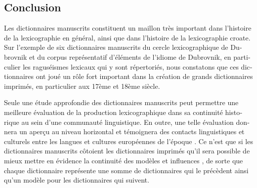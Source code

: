 \documentclass[output=paper,colorlinks,citecolor=brown,arabicfont,chinesefont,booklanguage=french]{langscibook}
\begin{document}
\begin{otherlanguage}{french}
\section{Conclusion}

Les dictionnaires manuscrits constituent un maillon très important dans l’histoire de la lexicographie en général, ainsi que dans l’histoire de la lexicographie croate. Sur l’exemple de six dictionnaires manuscrits du cercle lexicographique de Dubrovnik et du corpus représentatif d’éléments de l’idiome de Dubrovnik, en particulier les raguséismes lexicaux qui y sont répertoriés, nous constatons que ces dictionnaires ont joué un rôle fort important dans la création de grands dictionnaires imprimés, en particulier aux 17ème et 18ème siècle. 

Seule une étude approfondie des dictionnaires manuscrits peut permettre une meilleure évaluation de la production lexicographique dans sa continuité historique au sein d’une communauté linguistique. En outre, une telle évaluation donnera un aperçu au niveau horizontal et témoignera des contacts linguistiques et culturels entre les langues et cultures européennes de l’époque \citep{Dubois1970}. Ce n’est que si les dictionnaires manuscrits côtoient les dictionnaires imprimés qu’il sera possible de mieux mettre en évidence la continuité des modèles et influences \citep{Samardzija2013}, de sorte que chaque dictionnaire représente une somme de dictionnaires qui le précèdent ainsi qu’un modèle pour les dictionnaires qui suivent.

{\sloppy\printbibliography[heading=subbibliography,notkeyword=this]}
\end{otherlanguage}
\end{document}
